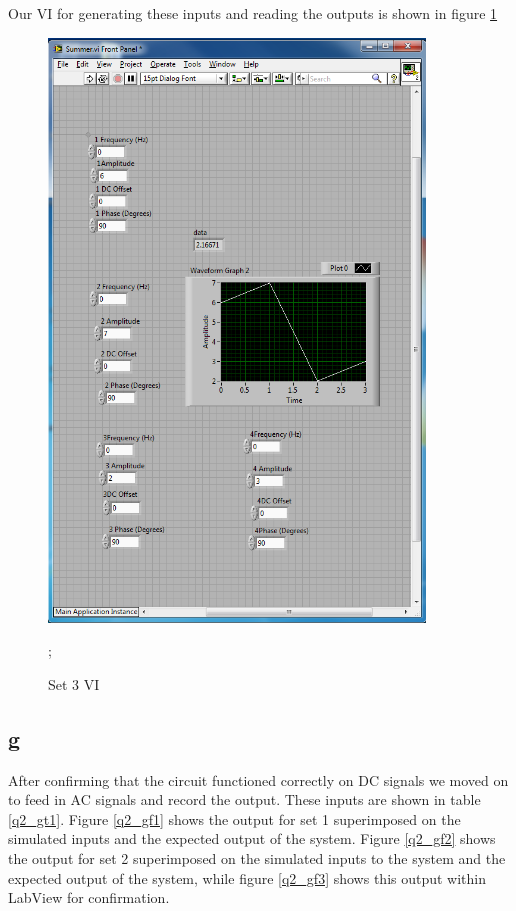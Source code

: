 \documentclass{article}
\theoremstyle{plain}
\theoremstyle{definition}
\theoremstyle{remark}
\begin{document}
Our VI for generating these inputs and reading the outputs is shown in figure \ref{q2_f2}

\begin{figure}[h]
\begin{center}
\includegraphics[width = 10cm]{set3problem2.png}
\end{center}
\caption{Set 3 VI};
\label{q2_f2}
\end{figure}

\subsection*{g}
After confirming that the circuit functioned correctly on DC signals we moved on to feed in AC signals and record the output.  These inputs are shown in table \ref{q2_gt1}.  Figure \ref{q2_gf1} shows the output for set 1 superimposed on the simulated inputs and the expected output of the system.  Figure \ref{q2_gf2} shows the output for set 2 superimposed on the simulated inputs to the system and the expected output of the system, while figure \ref{q2_gf3} shows this output within LabView for confirmation.
\end{document}
